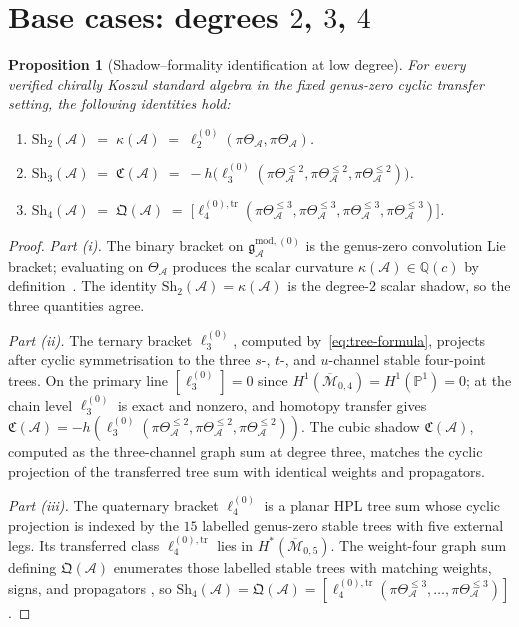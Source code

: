 \documentclass[11pt,reqno]{amsart}
\newtheorem{proposition}[theorem]{Proposition}
\theoremstyle{definition}
\theoremstyle{remark}
\providecommand{\cA}{\mathcal{A}}
\providecommand{\cM}{\mathcal{M}}
\providecommand{\gmodzero}{\mathfrak{g}^{\mathrm{mod},(0)}_{\cA}}
\providecommand{\Sh}{\mathrm{Sh}}
\numberwithin{equation}{section}
\begin{document}
\section{Base cases: degrees $2$, $3$, $4$}\label{sec:base-cases}

\begin{proposition}[Shadow--formality identification at low degree]
\label{prop:base-cases}
For every verified chirally Koszul standard algebra in the fixed
genus-zero cyclic transfer setting, the following identities hold:
\begin{enumerate}[label=\textup{(\roman*)}]
\item $\Sh_2(\cA)\;=\;\kappa(\cA)
\;=\;\ell_2^{(0)}(\pi\Theta_{\cA},\pi\Theta_{\cA})$.
\item $\Sh_3(\cA)\;=\;\mathfrak{C}(\cA)
\;=\;-h\bigl(\ell_3^{(0)}(\pi\Theta^{\le 2}_{\cA},
\pi\Theta^{\le 2}_{\cA},\pi\Theta^{\le 2}_{\cA})\bigr)$.
\item $\Sh_4(\cA)\;=\;\mathfrak{Q}(\cA)
\;=\;\bigl[\ell_4^{(0),\mathrm{tr}}(\pi\Theta^{\le 3}_{\cA},
\pi\Theta^{\le 3}_{\cA},\pi\Theta^{\le 3}_{\cA},
\pi\Theta^{\le 3}_{\cA})\bigr]$.
\end{enumerate}
\end{proposition}

\begin{proof}
\emph{Part (i).} The binary bracket on $\gmodzero$ is the
genus-zero convolution Lie bracket; evaluating on
$\Theta_{\cA}$ produces the scalar curvature
$\kappa(\cA)\in\mathbb{Q}(c)$ by
definition~\cite[Theorem~D]{Lorgat26}. The identity
$\Sh_2(\cA)=\kappa(\cA)$ is the degree-$2$ scalar shadow, so the
three quantities agree.

\emph{Part (ii).} The ternary bracket $\ell_3^{(0)}$,
computed by~\eqref{eq:tree-formula}, projects after cyclic
symmetrisation to the three $s$-, $t$-, and $u$-channel stable
four-point trees. On the primary line $[\ell_3^{(0)}]=0$ since
$H^1(\overline{\cM}_{0,4})=H^1(\mathbb{P}^1)=0$; at the chain
level $\ell_3^{(0)}$ is exact and nonzero, and homotopy
transfer gives
$\mathfrak{C}(\cA)=-h(\ell_3^{(0)}(\pi\Theta^{\le 2}_{\cA},
\pi\Theta^{\le 2}_{\cA},\pi\Theta^{\le 2}_{\cA}))$.
The cubic shadow $\mathfrak{C}(\cA)$, computed as the
three-channel graph sum at degree three, matches the cyclic
projection of the transferred tree sum with identical weights and
propagators.

\emph{Part (iii).} The quaternary bracket $\ell_4^{(0)}$ is a
planar HPL tree sum whose cyclic projection is indexed by the
$15$ labelled genus-zero stable trees with five external legs.
Its transferred class
$\ell_4^{(0),\mathrm{tr}}$ lies in $H^*(\overline{\cM}_{0,5})$.
The weight-four graph sum defining $\mathfrak{Q}(\cA)$
enumerates those labelled stable trees with matching weights,
signs, and propagators
\cite[appendix on nonlinear modular shadows]{Lorgat26},
so $\Sh_4(\cA)=\mathfrak{Q}(\cA)=
[\ell_4^{(0),\mathrm{tr}}(\pi\Theta^{\le 3}_{\cA},\dots,
\pi\Theta^{\le 3}_{\cA})]$.
\end{proof}
\end{document}
